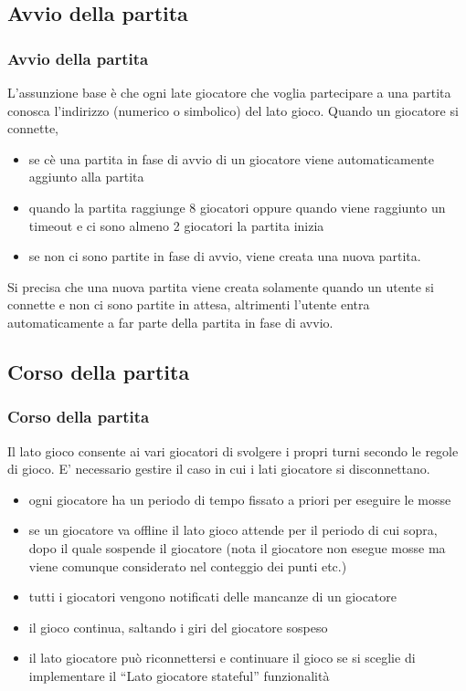 \documentclass{beamer}
\begin{document}
\subsection{Avvio della partita}
\begin{frame}
\frametitle{Avvio della partita}
L'assunzione base \`e che ogni late giocatore che voglia partecipare a
una partita conosca l'indirizzo (numerico o simbolico) del lato gioco. Quando un giocatore si connette, 
\begin{itemize}
\item se c\`e una partita in fase di avvio di un giocatore viene automaticamente aggiunto alla partita
\item quando la partita raggiunge 8 giocatori oppure quando viene raggiunto un timeout  e ci sono almeno 2 giocatori la partita inizia
\item se non ci sono partite in fase di avvio, viene creata una nuova partita.
\end{itemize}
Si precisa che una nuova partita viene creata solamente quando un
utente si connette e non ci sono partite in attesa, altrimenti
l'utente entra automaticamente a far parte della partita in fase di
avvio. 
\end{frame}

\subsection{Corso della partita}
\begin{frame}
\frametitle{Corso della partita}
Il lato gioco consente ai vari giocatori di svolgere i propri turni
secondo le regole di gioco. E' necessario gestire il caso in cui i
lati giocatore si disconnettano.
\begin{itemize}
\item ogni giocatore ha un periodo di tempo fissato a priori per  eseguire le mosse 
\item se un giocatore va offline il lato gioco attende per il periodo di
  cui sopra,
  dopo il quale sospende il giocatore (nota il giocatore non esegue
  mosse ma viene comunque considerato nel conteggio dei punti etc.) 
\item tutti i giocatori vengono notificati delle mancanze di un giocatore
\item il gioco continua, saltando i giri del giocatore sospeso
\item il lato giocatore può riconnettersi e continuare il gioco se si
  sceglie di implementare il ``Lato giocatore stateful''
  funzionalit\`a 
\end{itemize}
\end{frame}
\end{document}
